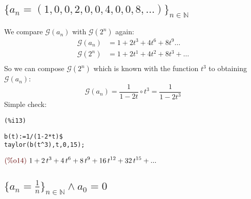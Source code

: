 \subsection{$\{a_n = (1,0,0,2,0,0,4,0,0,8,\ldots)\}_{n\in \mathbb{N} }$}

We compare $\mathcal{G}(a_n) $ with $\mathcal{G} (2^n)$ again:
\begin{displaymath}
  \begin{split}
    \mathcal{G} (a_n) &= 1 + 2t^3 + 4t^6 + 8t^9\ldots \\
    \mathcal{G} (2^n) &= 1 + 2t^1 + 4t^2 + 8t^3 + \ldots \\
  \end{split}
\end{displaymath}
So we can compose $\mathcal{G} (2^n)$ which is known with the function
$t^3$ to obtaining $\mathcal{G} (a_n)$:
\begin{displaymath}
  \mathcal{G} (a_n) =  \frac{1}{1-2t} \circ t^3 =  \frac{1}{1-2t^3} 
\end{displaymath}
Simple check:

\noindent
\begin{minipage}[t]{8ex}{\color{red}\bf
\begin{verbatim}
(%i13) 
\end{verbatim}}
\end{minipage}
\begin{minipage}[t]{\textwidth}{\color{blue}
\begin{verbatim}
b(t):=1/(1-2*t)$
taylor(b(t^3),t,0,15);
\end{verbatim}}
\end{minipage}
\begin{math}\displaystyle
\parbox{8ex}{\color{labelcolor}(\%o14) }
1+2\,{t}^{3}+4\,{t}^{6}+8\,{t}^{9}+16\,{t}^{12}+32\,{t}^{15}+...
\end{math}

\subsection{$\{a_n =  \frac{1}{n} \}_{n\in \mathbb{N} } \wedge a_0 = 0$}

